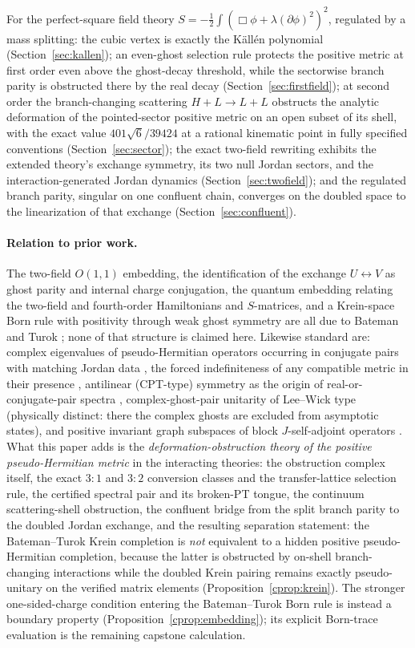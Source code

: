 \documentclass[11pt]{article}
\theoremstyle{definition}
\theoremstyle{remark}
\begin{document}
For the perfect-square field theory
$S=-\tfrac12\int(\Box\phi+\lambda(\partial\phi)^2)^2$, regulated by a
mass splitting: the cubic vertex is exactly the K\"all\'en polynomial
(Section~\ref{sec:kallen}); an even-ghost selection rule protects the
positive metric at first order even above the ghost-decay threshold,
while the sectorwise branch parity is obstructed there by the real
decay (Section~\ref{sec:firstfield}); at second order the
branch-changing scattering $H+L\to L+L$ obstructs the analytic
deformation of the pointed-sector positive metric on an open subset of
its shell, with the exact value $401\sqrt6/39424$ at a rational
kinematic point in fully specified conventions
(Section~\ref{sec:sector}); the exact two-field rewriting exhibits the
extended theory's exchange symmetry, its two null Jordan sectors, and
the interaction-generated Jordan dynamics (Section~\ref{sec:twofield});
and the regulated branch parity, singular on one confluent chain,
converges on the doubled space to the linearization of that exchange
(Section~\ref{sec:confluent}).

\paragraph{Relation to prior work.}
The two-field $O(1,1)$ embedding, the identification of the exchange
$U\leftrightarrow V$ as ghost parity and internal charge conjugation,
the quantum embedding relating the two-field and fourth-order
Hamiltonians and $S$-matrices, and a Krein-space Born rule with
positivity through weak ghost symmetry are all due to Bateman and
Turok \cite{BT2026}; none of that structure is claimed here.
Likewise standard are: complex eigenvalues of pseudo-Hermitian
operators occurring in conjugate pairs with matching Jordan data
\cite{Mostafazadeh2002nd}, the forced indefiniteness of any compatible
metric in their presence \cite{FeinbergZnojil2021}, antilinear
(CPT-type) symmetry as the origin of real-or-conjugate-pair spectra
\cite{Mannheim2016}, complex-ghost-pair unitarity of Lee--Wick type
\cite{LiuModestoCalcagni2022} (physically distinct: there the complex
ghosts are excluded from asymptotic states), and
positive invariant graph subspaces of block $J$-self-adjoint operators
\cite{AzizovIokhvidov}.  What this paper adds is the
\emph{deformation-obstruction theory of the positive pseudo-Hermitian
metric} in the interacting theories: the obstruction complex itself,
the exact $3{:}1$ and $3{:}2$ conversion classes and the
transfer-lattice selection rule, the certified spectral pair and its
broken-PT tongue, the continuum scattering-shell obstruction, the
confluent bridge from the split branch parity to the doubled Jordan
exchange, and the resulting separation statement: the Bateman--Turok
Krein completion is \emph{not} equivalent to a hidden positive
pseudo-Hermitian completion, because the latter is obstructed by
on-shell branch-changing interactions while the doubled Krein pairing
remains exactly pseudo-unitary on the verified matrix elements
(Proposition~\ref{cprop:krein}).  The stronger one-sided-charge
condition entering the Bateman--Turok Born rule is instead a boundary
property (Proposition~\ref{cprop:embedding}); its explicit Born-trace
evaluation is the remaining capstone calculation.
\end{document}
